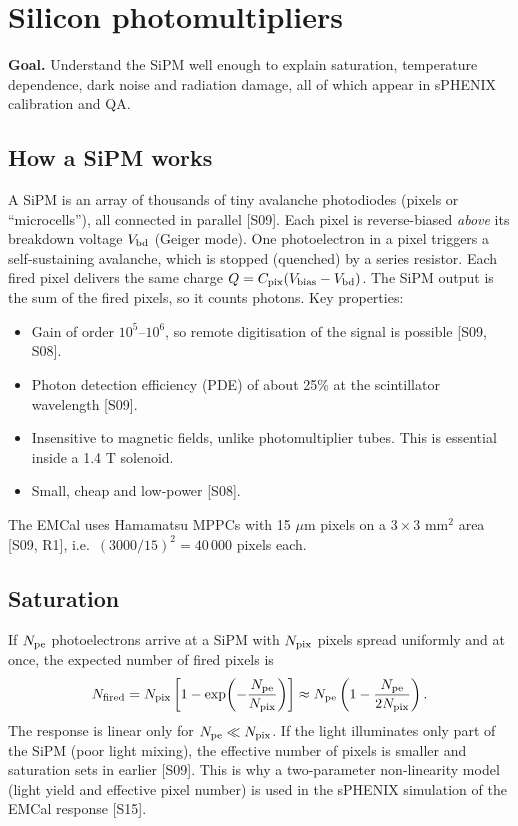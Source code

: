 \documentclass[11pt,letterpaper]{article}
\newcommand{\goal}[1]{\par\noindent\textbf{Goal.} #1\par\smallskip}
\begin{document}
\section{Silicon photomultipliers}\label{sec:sipm}
\goal{Understand the SiPM well enough to explain saturation, temperature dependence, dark noise and radiation damage, all of which appear in sPHENIX calibration and QA.}

\subsection{How a SiPM works}
A SiPM is an array of thousands of tiny avalanche photodiodes (pixels or ``microcells''), all connected in parallel [S09].
Each pixel is reverse-biased \emph{above} its breakdown voltage $V_{\rm bd}$ (Geiger mode).
One photoelectron in a pixel triggers a self-sustaining avalanche, which is stopped (quenched) by a series resistor.
Each fired pixel delivers the same charge $Q=C_{\rm pix}(V_{\rm bias}-V_{\rm bd})$.
The SiPM output is the sum of the fired pixels, so it counts photons.
Key properties:
\begin{itemize}
\item Gain of order $10^5$--$10^6$, so remote digitisation of the signal is possible [S09, S08].
\item Photon detection efficiency (PDE) of about 25\% at the scintillator wavelength [S09].
\item Insensitive to magnetic fields, unlike photomultiplier tubes. This is essential inside a 1.4 T solenoid.
\item Small, cheap and low-power [S08].
\end{itemize}
The EMCal uses Hamamatsu MPPCs with 15 $\mu$m pixels on a $3\times3$ mm$^2$ area [S09, R1], i.e.\ $(3000/15)^2=40\,000$ pixels each.

\subsection{Saturation}
If $N_{\rm pe}$ photoelectrons arrive at a SiPM with $N_{\rm pix}$ pixels spread uniformly and at once, the expected number of fired pixels is
\begin{equation}
N_{\rm fired}=N_{\rm pix}\left[1-\exp\!\left(-\frac{N_{\rm pe}}{N_{\rm pix}}\right)\right]\approx N_{\rm pe}\left(1-\frac{N_{\rm pe}}{2N_{\rm pix}}\right).
\end{equation}
The response is linear only for $N_{\rm pe}\ll N_{\rm pix}$.
If the light illuminates only part of the SiPM (poor light mixing), the effective number of pixels is smaller and saturation sets in earlier [S09].
This is why a two-parameter non-linearity model (light yield and effective pixel number) is used in the sPHENIX simulation of the EMCal response [S15].
\end{document}
